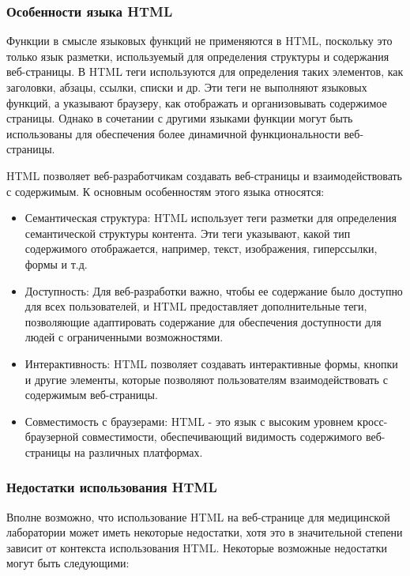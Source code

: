 \subsubsection{Особенности языка HTML}

Функции в смысле языковых функций не применяются в HTML, поскольку это только язык разметки, используемый для определения структуры и содержания веб-страницы. В HTML теги используются для определения таких элементов, как заголовки, абзацы, ссылки, списки и др. Эти теги не выполняют языковых функций, а указывают браузеру, как отображать и организовывать содержимое страницы. Однако в сочетании с другими языками функции могут быть использованы для обеспечения более динамичной функциональности веб-страницы.

HTML позволяет веб-разработчикам создавать веб-страницы и взаимодействовать с содержимым. К основным особенностям этого языка относятся:

\begin{itemize}
	\item Семантическая структура: HTML использует теги разметки для определения семантической структуры контента. Эти теги указывают, какой тип содержимого отображается, например, текст, изображения, гиперссылки, формы и т.д.
	\item Доступность: Для веб-разработки важно, чтобы ее содержание было доступно для всех пользователей, и HTML предоставляет дополнительные теги, позволяющие адаптировать содержание для обеспечения доступности для людей с ограниченными возможностями.
	\item Интерактивность: HTML позволяет создавать интерактивные формы, кнопки и другие элементы, которые позволяют пользователям взаимодействовать с содержимым веб-страницы.
	\item Совместимость с браузерами: HTML - это язык с высоким уровнем кросс-браузерной совместимости, обеспечивающий видимость содержимого веб-страницы на различных платформах.
\end{itemize}

\subsubsection{Недостатки использования HTML}

Вполне возможно, что использование HTML на веб-странице для медицинской лаборатории может иметь некоторые недостатки, хотя это в значительной степени зависит от контекста использования HTML. Некоторые возможные недостатки могут быть следующими:

